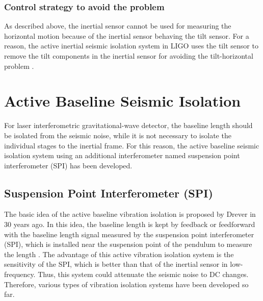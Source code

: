 \subsubsection{Control strategy to avoid the problem}
As described above, the inertial sensor cannot be used for measuring the horizontal motion because of the inertial sensor behaving the tilt sensor. For a reason, the active inertial seismic isolation system in LIGO uses the tilt sensor to remove the tilt components in the inertial sensor for avoiding the tilt-horizontal problem \cite{biscans2018optimization}.


\section{Active Baseline Seismic Isolation} \label{sec:53}
For laser interferometric gravitational-wave detector, the baseline length should be isolated from the seismic noise, while it is not necessary to isolate the individual stages to the inertial frame. For this reason, the active baseline seismic isolation system using an additional interferometer named suspension point interferometer (SPI) has been developed.

\subsection{Suspension Point Interferometer (SPI)} \label{sec:321}
The basic idea of the active baseline vibration isolation is proposed by Drever in 30 years ago. In this idea, the baseline length is kept by feedback or feedforward with the baseline length signal measured by the suspension point interferometer (SPI), which is installed near the suspension point of the pendulum to measure the length \cite{drever1987outline}. The advantage of this active vibration isolation system is the sensitivity of the SPI, which is better than that of the inertial sensor in low-frequency. Thus, this system could attenuate the seismic noise to DC changes. Therefore, various types of vibration isolation systems have been developed so far.

